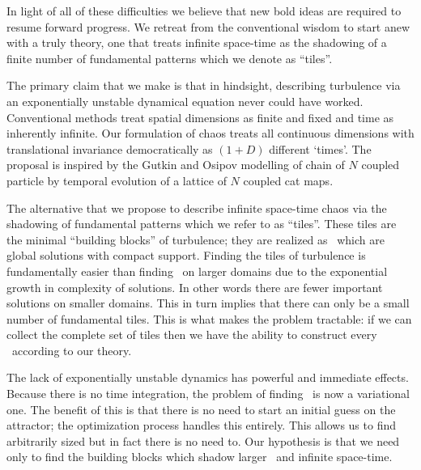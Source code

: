 In light of all of these difficulties 
we believe that new bold ideas are required to resume forward progress.
We retreat from the conventional wisdom to start anew with a truly
{\spt} theory, one that treats infinite space-time as the shadowing
of a finite number of fundamental patterns which we denote as ``tiles''.  




The primary claim that we make is that in hindsight, describing turbulence
via an exponentially unstable dynamical equation never could have worked. 
Conventional methods treat spatial dimensions
as finite and fixed and time as inherently infinite.
Our {\spt} formulation of chaos treats all continuous dimensions with translational
invariance democratically as $(1+D)$ different `times'. 
The proposal is inspired by the Gutkin and Osipov 
modelling of chain of $N$ coupled particle by temporal evolution of a
lattice of $N$ coupled cat maps.

The alternative that we propose to describe infinite space-time chaos via
the shadowing of fundamental patterns which we refer to as ``tiles''.
These tiles are the minimal ``building blocks'' of turbulence; they are realized
as \twots\ which are global solutions with compact support. 
Finding the tiles of turbulence is fundamentally easier than finding
\twots\ on larger domains due to the exponential growth in complexity of
solutions. In other words there are fewer important solutions on smaller
domains. This in turn implies that there can only be a small
number of fundamental tiles. This is what makes the problem tractable:
if we can collect the complete set of tiles then we have the ability to
construct every \twot\ according to our theory.

The lack of exponentially unstable dynamics has powerful and immediate effects.
Because there is no time integration, the problem of finding \twots\ is
now a variational one. The benefit of this is that there is no need to start
an initial guess on the attractor; the optimization process handles this
entirely. This allows us to find arbitrarily sized \twots but in fact
there is no need to. Our hypothesis is that we need only to find the
building blocks which shadow larger \twots\ and infinite space-time.

